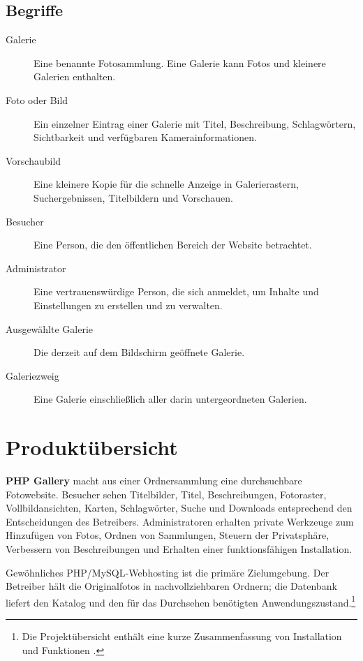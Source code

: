 \documentclass[11pt,a4paper]{article}
\newcommand{\product}{\textbf{PHP Gallery}}
\begin{document}
\subsection{Begriffe}

\begin{description}
  \item[Galerie] Eine benannte Fotosammlung. Eine Galerie kann Fotos und
  kleinere Galerien enthalten.
  \item[Foto oder Bild] Ein einzelner Eintrag einer Galerie mit Titel,
  Beschreibung, Schlagwörtern, Sichtbarkeit und verfügbaren Kamerainformationen.
  \item[Vorschaubild] Eine kleinere Kopie für die schnelle Anzeige in
  Galerierastern, Suchergebnissen, Titelbildern und Vorschauen.
  \item[Besucher] Eine Person, die den öffentlichen Bereich der Website
  betrachtet.
  \item[Administrator] Eine vertrauenswürdige Person, die sich anmeldet, um
  Inhalte und Einstellungen zu erstellen und zu verwalten.
  \item[Ausgewählte Galerie] Die derzeit auf dem Bildschirm geöffnete Galerie.
  \item[Galeriezweig] Eine Galerie einschließlich aller darin untergeordneten
  Galerien.
\end{description}

\section{Produktübersicht}
\label{sec:overview}

\product{} macht aus einer Ordnersammlung eine durchsuchbare Fotowebsite.
Besucher sehen Titelbilder, Titel, Beschreibungen, Fotoraster,
Vollbildansichten, Karten, Schlagwörter, Suche und Downloads entsprechend den
Entscheidungen des Betreibers. Administratoren erhalten private Werkzeuge zum
Hinzufügen von Fotos, Ordnen von Sammlungen, Steuern der Privatsphäre,
Verbessern von Beschreibungen und Erhalten einer funktionsfähigen Installation.

Gewöhnliches PHP/MySQL-Webhosting ist die primäre Zielumgebung. Der Betreiber
hält die Originalfotos in nachvollziehbaren Ordnern; die Datenbank liefert den
Katalog und den für das Durchsehen benötigten Anwendungszustand.\footnote{Die
Projektübersicht enthält eine kurze Zusammenfassung von Installation und
Funktionen \cite{readme}.}
\end{document}
